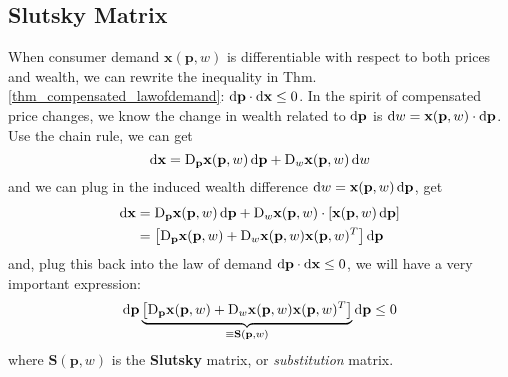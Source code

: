 \subsection{Slutsky Matrix}
When consumer demand $\mathbf{x}(\mathbf{p},w)$ is differentiable with respect to both prices and wealth, we can rewrite the inequality in Thm.\ref{thm_compensated_lawofdemand}: $\mathop{}\!\mathrm{d} \mathbf{p}\cdot \mathop{}\!\mathrm{d} \mathbf{x}\leq 0$. In the spirit of compensated price changes, we know the change in wealth related to $\mathop{}\!\mathrm{d} \mathbf{p}$ is $\mathop{}\!\mathrm{d} w=\mathbf{x}(\mathbf{p},w)\cdot \mathop{}\!\mathrm{d} \mathbf{p}$.
Use the chain rule, we can get
$$\mathop{}\!\mathrm{d} \mathbf{x}= \mathop{}\!\mathrm{D}_{\mathbf{p}}\mathbf{x}(\mathbf{p},w)\mathop{}\!\mathrm{d} \mathbf{p} + \mathop{}\!\mathrm{D}_w \mathbf{x}(\mathbf{p},w)\mathop{}\!\mathrm{d} w$$
and we can plug in the induced wealth difference $\mathop{}\!\mathrm{d} w=\mathbf{x}(\mathbf{p},w)\mathop{}\!\mathrm{d} \mathbf{p}$, get
\begin{align*}
    \diff \mathbf{x} & = \mdiff_{\mathbf{p}}\mathbf{x}(\mathbf{p},w)\diff \mathbf{p} + \mdiff_w \mathbf{x}(\mathbf{p},w) \cdot \left[\mathbf{x}(\mathbf{p},w)\diff \mathbf{p}\right]\\
    & =\left[ \mdiff_{\mathbf{p}}\mathbf{x}(\mathbf{p},w) + \mdiff_w \mathbf{x}(\mathbf{p},w)\mathbf{x}(\mathbf{p},w)^T\right] \diff \mathbf{p}
\end{align*}
and, plug this back into the law of demand $ \mathop{}\!\mathrm{d} \mathbf{p}\cdot \mathop{}\!\mathrm{d} \mathbf{x}\leq 0$, we will have a very important expression:
$$
\mathop{}\!\mathrm{d} \mathbf{p} \underbrace{\left[ \mathop{}\!\mathrm{D}_{\mathbf{p}}\mathbf{x}(\mathbf{p},w) + \mathop{}\!\mathrm{D}_w \mathbf{x}(\mathbf{p},w)\mathbf{x}(\mathbf{p},w)^T\right]}_{\equiv \mathbf{S}(\mathbf{p},w)} \mathop{}\!\mathrm{d} \mathbf{p}\leq 0
$$
where $\mathbf{S}(\mathbf{p},w)$ is the \textbf{Slutsky} matrix, or \textit{substitution} matrix. 

